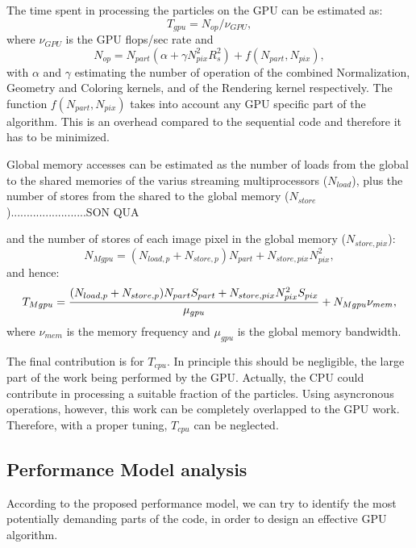 \documentclass[11pt]{article}
\begin{document}
The time spent in processing the particles on the GPU can be estimated as:
\begin{equation}
T_{gpu} = N_{op}/\nu_{GPU},
\end{equation}
where $\nu_{GPU}$ is the GPU flops/sec rate and
\begin{equation}
N_{op} = N_{part}(\alpha + \gamma N_{pix}^2 R_s^2) + f(N_{part},N_{pix}),
\end{equation}
with $\alpha$ and $\gamma$ estimating the number of operation of 
the combined Normalization, Geometry and Coloring kernels,  
and of the Rendering kernel respectively. The function 
$f(N_{part},N_{pix})$ takes into account any GPU specific part of the algorithm. 
This is an overhead compared to the sequential code and therefore it has to 
be minimized.

Global memory accesses can be estimated 
as the number of loads from the global to the shared memories of the varius 
streaming multiprocessors
($N_{load}$), plus the number of stores from the shared to the global memory 
($N_{store}$)........................SON QUA

 

and the number
of stores of each image pixel in the global memory ($N_{store,pix}$):
\begin{equation}
N_{Mgpu} = (N_{load,p} + N_{store,p}) N_{part} + N_{store,pix} N_{pix}^2,
\end{equation}
and hence:
\begin{equation}
T_{Mgpu} = {(N_{load,p} + N_{store,p}) N_{part} S_{part} 
+ N_{store,pix} N_{pix}^2 S_{pix} \over \mu_{gpu}}
+ N_{Mgpu} \nu_{mem},
\end{equation}
where $\nu_{mem}$ is the memory frequency and $\mu_{gpu}$ is the global memory bandwidth.

The final contribution is for $T_{cpu}$. In principle this should be negligible, 
the large part of the work being performed by the GPU. Actually, the CPU
could contribute in processing a suitable fraction of the particles. Using
asyncronous operations, however, this work can be completely overlapped 
to the GPU work. Therefore, with a proper tuning, $T_{cpu}$ can be neglected.

\subsection{Performance Model analysis}

According to the proposed performance model, we can try to identify the most 
potentially demanding parts of the code, in order to design an 
effective GPU algorithm.
\end{document}
